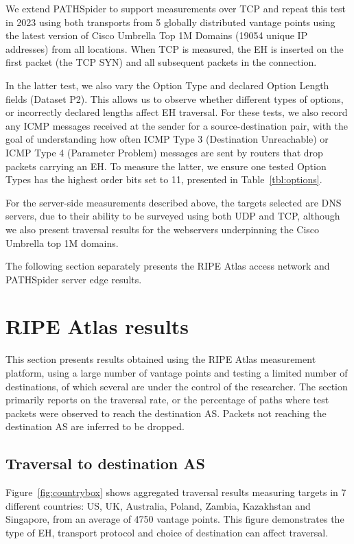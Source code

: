 \documentclass[conference]{IEEEtran}
\begin{document}
We extend PATHSpider to support measurements over TCP and repeat this test in 2023 using both transports from 5 globally distributed vantage points using the latest version of Cisco Umbrella Top 1M Domains (19054 unique IP addresses) from all locations. When TCP is measured, the EH is inserted on the first packet (the TCP SYN) and all subsequent packets in the connection.

In the latter test, we also vary the Option Type and declared Option Length fields (Dataset P2). This allows us to observe whether different types of options, or incorrectly declared lengths affect EH traversal. For these tests, we also record any ICMP messages received at the sender for a source-destination pair, with the goal of understanding how often ICMP Type 3 (Destination Unreachable) or ICMP Type 4 (Parameter Problem) messages are sent by routers that drop packets carrying an EH. To measure the latter, we ensure one tested Option Types has the highest order bits set to 11, presented in Table~\ref{tbl:options}.


For the server-side measurements described above, the targets selected are DNS servers, due to their ability to be surveyed using both UDP and TCP, although we also present traversal results for the webservers underpinning the Cisco Umbrella top 1M domains.

The following section separately presents the RIPE Atlas access network and PATHSpider server edge results.

\section{RIPE Atlas results} 
\label{sec:ripe-results}

This section presents results obtained using the RIPE Atlas measurement platform, using a large number of vantage points and testing a limited number of destinations, of which several are under the control of the researcher. The section primarily reports on the traversal rate, or the percentage of paths where test packets were observed to reach the destination AS. Packets not reaching the destination AS are inferred to be dropped. 

\subsection{Traversal to destination AS}

Figure~\ref{fig:countrybox} shows aggregated traversal results measuring targets in 7 different countries: US, UK, Australia, Poland, Zambia, Kazakhstan and Singapore, from an average of 4750 vantage points. This figure demonstrates the type of EH, transport protocol and choice of destination can affect traversal.
\end{document}
